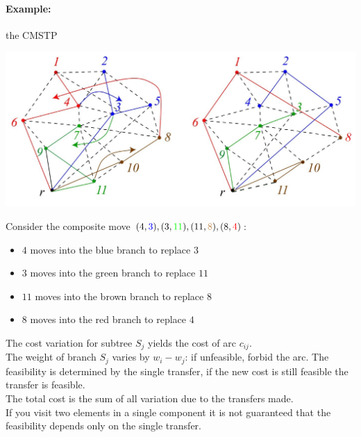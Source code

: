 \paragraph{Example:} the CMSTP
\begin{center}
	\includegraphics[width=0.9\columnwidth]{img/CMSTP1}
\end{center}
Consider the composite move $(4, {\color{blue} 3}), (3, {\color{green} 11}), (11, {\color{brown} 8}), (8, {\color{red} 4})$:
\begin{itemize}
	\item $4$ moves into the blue branch to replace $3$
	\item $3$ moves into the green branch to replace $11$
	\item $11$ moves into the brown branch to replace $8$
	\item $8$ moves into the red branch to replace $4$
\end{itemize}

The cost variation for subtree $S_j$ yields the cost of arc $c_{ij}$.\\

The weight of branch $S_j$ varies by $w_i - w_j$: if unfeasible, forbid the arc. The feasibility is determined by the single transfer, if the new cost is still feasible the transfer is feasible.\\

The total cost is the sum of all variation due to the transfers made.\\

If you visit two elements in a single component it is not guaranteed that the feasibility depends only on the single transfer.\\

\newpage

